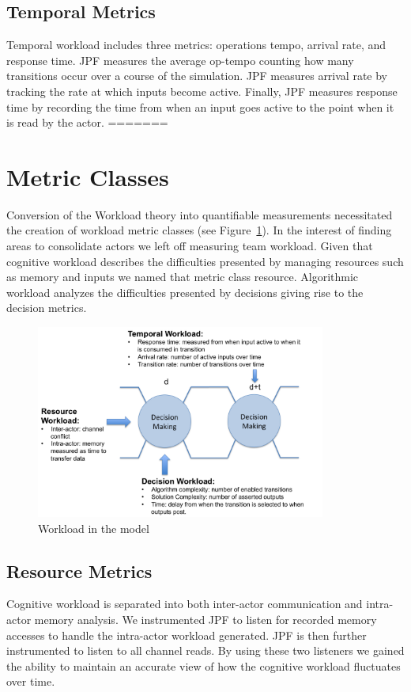 \subsection{Temporal Metrics}
Temporal workload includes three metrics: operations tempo, arrival rate, and response time.  JPF measures the average op-tempo counting how many transitions occur over a course of the simulation. JPF measures arrival rate by tracking the rate at which inputs become active. Finally, JPF measures response time by recording the time from when an input goes active to the point when it is read by the actor.
=======
\section{Metric Classes}
Conversion of the Workload theory into quantifiable measurements necessitated the creation of workload metric classes (see Figure~\ref{fig:WorkloadMetrics}). In the interest of finding areas to consolidate actors we left off measuring team workload. Given that cognitive workload describes the difficulties presented by managing resources such as memory and inputs we named that metric class resource. Algorithmic workload analyzes the difficulties presented by decisions giving rise to the decision metrics.


\begin{figure}[h]
\center
\setlength{\abovecaptionskip}{1mm}
\setlength{\belowcaptionskip}{1mm}
\setlength{\textfloatsep}{1mm}
\setlength{\floatsep}{1mm}
\includegraphics[height=2.5in]{WorkloadMetrics.png}
\caption{Workload in the model}
\label{fig:WorkloadMetrics}
\end{figure}

\subsection{Resource Metrics}
Cognitive workload is separated into both inter-actor communication and intra-actor memory analysis. We instrumented JPF to listen for recorded memory accesses to handle the intra-actor workload generated. JPF is then further instrumented to listen to all channel reads. By using these two listeners we gained the ability to maintain an accurate view of how the cognitive workload fluctuates over time.

